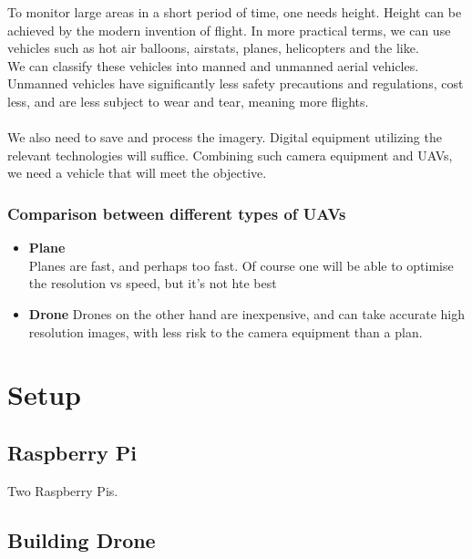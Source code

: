To monitor large areas in a short period of time, one needs height. Height can be achieved by the modern invention of flight. In more practical terms, we can use vehicles such as hot air balloons, airstats, planes, helicopters and the like.\\

\noindent
We can classify these vehicles into manned and unmanned aerial vehicles. Unmanned vehicles have significantly less safety precautions and regulations, cost less, and are less subject to wear and tear, meaning more flights.\\\\

\noindent
We also need to save and process the imagery. Digital equipment utilizing the relevant technologies will suffice. Combining such camera equipment and UAVs, we need a vehicle that will meet the objective.

\subsubsection{Comparison between different types of UAVs}

\begin{itemize}
    \item \textbf{Plane}\\
    Planes are fast, and perhaps too fast. Of course one will be able to optimise the resolution vs speed, but it's not hte best
    \item \textbf{Drone}
    Drones on the other hand are inexpensive, and can take accurate high resolution images, with less risk to the camera equipment than a plan.
\end{itemize}

\section{Setup}

\subsection{Raspberry Pi}

Two Raspberry Pis.

\subsection{Building Drone}

